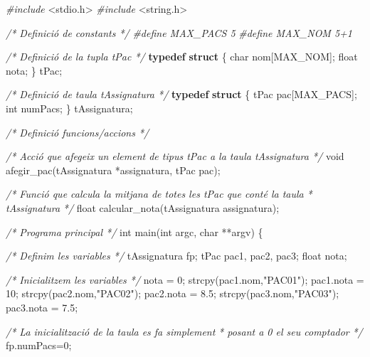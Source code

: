 \documentclass[
]{book}
\newenvironment{Shaded}{\begin{snugshade}}{\end{snugshade}}
\newcommand{\CommentTok}[1]{\textcolor[rgb]{0.56,0.35,0.01}{\textit{#1}}}
\newcommand{\DataTypeTok}[1]{\textcolor[rgb]{0.13,0.29,0.53}{#1}}
\newcommand{\DecValTok}[1]{\textcolor[rgb]{0.00,0.00,0.81}{#1}}
\newcommand{\FloatTok}[1]{\textcolor[rgb]{0.00,0.00,0.81}{#1}}
\newcommand{\ImportTok}[1]{#1}
\newcommand{\KeywordTok}[1]{\textcolor[rgb]{0.13,0.29,0.53}{\textbf{#1}}}
\newcommand{\NormalTok}[1]{#1}
\newcommand{\PreprocessorTok}[1]{\textcolor[rgb]{0.56,0.35,0.01}{\textit{#1}}}
\newcommand{\StringTok}[1]{\textcolor[rgb]{0.31,0.60,0.02}{#1}}
\begin{document}
\begin{Shaded}
\begin{Highlighting}[]
\PreprocessorTok{\#include }\ImportTok{\textless{}stdio.h\textgreater{}}
\PreprocessorTok{\#include }\ImportTok{\textless{}string.h\textgreater{}}

\CommentTok{/* Definició de constants */}
\PreprocessorTok{\#define MAX\_PACS 5}
\PreprocessorTok{\#define MAX\_NOM 5+1}

\CommentTok{/* Definició de la tupla tPac */}
\KeywordTok{typedef} \KeywordTok{struct}\NormalTok{ \{}
    \DataTypeTok{char}\NormalTok{ nom[MAX\_NOM];}
    \DataTypeTok{float}\NormalTok{ nota;}
\NormalTok{\} tPac;}

\CommentTok{/* Definició de taula tAssignatura */}
\KeywordTok{typedef} \KeywordTok{struct}\NormalTok{ \{}
\NormalTok{    tPac pac[MAX\_PACS];}
    \DataTypeTok{int}\NormalTok{ numPacs;}
\NormalTok{\} tAssignatura;}

\CommentTok{/* Definició funcions/accions */}

\CommentTok{/* Acció que afegeix un element de tipus tPac a la taula tAssignatura */}
\DataTypeTok{void}\NormalTok{ afegir\_pac(tAssignatura *assignatura, tPac pac);}

\CommentTok{/* Funció que calcula la mitjana de totes les tPac que conté la taula}
\CommentTok{ * tAssignatura }
\CommentTok{ */}
\DataTypeTok{float}\NormalTok{ calcular\_nota(tAssignatura assignatura);}

\CommentTok{/* Programa principal */}
\DataTypeTok{int}\NormalTok{ main(}\DataTypeTok{int}\NormalTok{ argc, }\DataTypeTok{char}\NormalTok{ **argv) \{}

    \CommentTok{/* Definim les variables */}
\NormalTok{    tAssignatura fp;}
\NormalTok{    tPac pac1, pac2, pac3;}
    \DataTypeTok{float}\NormalTok{ nota;}

    \CommentTok{/* Inicialitzem les variables */}
\NormalTok{    nota = }\DecValTok{0}\NormalTok{;}
\NormalTok{    strcpy(pac1.nom,}\StringTok{"PAC01"}\NormalTok{);}
\NormalTok{    pac1.nota = }\DecValTok{10}\NormalTok{;}
\NormalTok{    strcpy(pac2.nom,}\StringTok{"PAC02"}\NormalTok{);}
\NormalTok{    pac2.nota = }\FloatTok{8.5}\NormalTok{;}
\NormalTok{    strcpy(pac3.nom,}\StringTok{"PAC03"}\NormalTok{);}
\NormalTok{    pac3.nota = }\FloatTok{7.5}\NormalTok{;}

    \CommentTok{/* La inicialització de la taula es fa simplement}
\CommentTok{     * posant a 0 el seu comptador }
\CommentTok{     */}
\NormalTok{    fp.numPacs=}\DecValTok{0}\NormalTok{;}


\end{Highlighting}
\end{Shaded}
\end{document}
